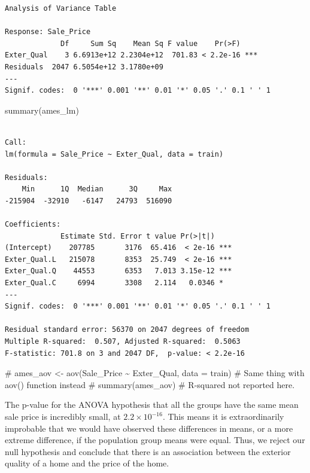 \documentclass[
  letterpaper,
  DIV=11,
  numbers=noendperiod]{scrreprt}
\newenvironment{Shaded}{\begin{snugshade}}{\end{snugshade}}
\newcommand{\CommentTok}[1]{\textcolor[rgb]{0.37,0.37,0.37}{#1}}
\newcommand{\FunctionTok}[1]{\textcolor[rgb]{0.28,0.35,0.67}{#1}}
\newcommand{\NormalTok}[1]{\textcolor[rgb]{0.00,0.23,0.31}{#1}}
\begin{document}
\begin{verbatim}
Analysis of Variance Table

Response: Sale_Price
             Df     Sum Sq    Mean Sq F value    Pr(>F)    
Exter_Qual    3 6.6913e+12 2.2304e+12  701.83 < 2.2e-16 ***
Residuals  2047 6.5054e+12 3.1780e+09                      
---
Signif. codes:  0 '***' 0.001 '**' 0.01 '*' 0.05 '.' 0.1 ' ' 1
\end{verbatim}

\begin{Shaded}
\begin{Highlighting}[]
\FunctionTok{summary}\NormalTok{(ames\_lm)}
\end{Highlighting}
\end{Shaded}

\begin{verbatim}

Call:
lm(formula = Sale_Price ~ Exter_Qual, data = train)

Residuals:
    Min      1Q  Median      3Q     Max 
-215904  -32910   -6147   24793  516090 

Coefficients:
             Estimate Std. Error t value Pr(>|t|)    
(Intercept)    207785       3176  65.416  < 2e-16 ***
Exter_Qual.L   215078       8353  25.749  < 2e-16 ***
Exter_Qual.Q    44553       6353   7.013 3.15e-12 ***
Exter_Qual.C     6994       3308   2.114   0.0346 *  
---
Signif. codes:  0 '***' 0.001 '**' 0.01 '*' 0.05 '.' 0.1 ' ' 1

Residual standard error: 56370 on 2047 degrees of freedom
Multiple R-squared:  0.507, Adjusted R-squared:  0.5063 
F-statistic: 701.8 on 3 and 2047 DF,  p-value: < 2.2e-16
\end{verbatim}

\begin{Shaded}
\begin{Highlighting}[]
\CommentTok{\# ames\_aov \textless{}{-} aov(Sale\_Price \textasciitilde{} Exter\_Qual, data = train) \# Same thing with aov() function instead}
\CommentTok{\# summary(ames\_aov) \# R{-}squared not reported here. }
\end{Highlighting}
\end{Shaded}

The p-value for the ANOVA hypothesis that all the groups have the same
mean sale price is incredibly small, at \(2.2\times10^{-16}\). This
means it is extraordinarily improbable that we would have observed these
differences in means, or a more extreme difference, if the population
group means were equal. Thus, we reject our null hypothesis and conclude
that there is an association between the exterior quality of a home and
the price of the home.
\end{document}
